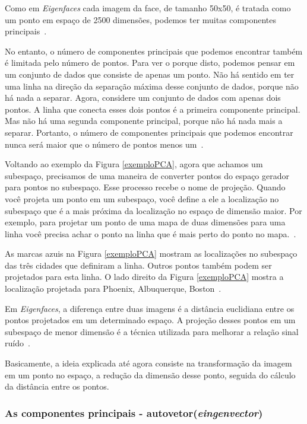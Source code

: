 Como em \textit{Eigenfaces} cada imagem da face, de tamanho 50x50, é tratada como um ponto em espaço de 2500 dimensões, podemos ter muitas componentes principais~\cite{hewitt}.

No entanto, o número de componentes principais que podemos encontrar também é limitada pelo número de pontos. Para ver o porque disto, podemos pensar em um conjunto de dados que consiste de apenas um ponto. Não há sentido em ter uma linha na direção da separação máxima desse conjunto de dados, porque não há nada a separar. Agora, considere um conjunto de dados com apenas dois pontos. A linha que conecta esses dois pontos é a primeira componente principal. Mas não há uma segunda componente principal, porque não há nada mais a separar. Portanto, o número de componentes principais que podemos encontrar nunca será maior que o número de pontos menos um~\cite{hewitt}.

Voltando ao exemplo da Figura \ref{exemploPCA}, agora que achamos um subespaço, precisamos de uma maneira de converter pontos do espaço gerador para pontos no subespaço. Esse processo recebe o nome de projeção. Quando você projeta um ponto em um subespaço, você define a ele a localização no subespaço que é a mais próxima da localização no espaço de dimensão maior. Por exemplo, para projetar um ponto de uma mapa de duas dimensões para uma linha você precisa achar o ponto na linha que é mais perto do ponto no mapa.~\cite{hewitt}.

As marcas azuis na Figura \ref{exemploPCA} mostram as localizações no subespaço das três cidades que definiram a linha. Outros pontos também podem ser projetados para esta linha. O lado direito da Figura \ref{exemploPCA} mostra a localização projetada para Phoenix, Albuquerque, Boston~\cite{hewitt}.

Em \textit{Eigenfaces}, a diferença entre duas imagens é a distância euclidiana entre os pontos projetados em um determinado espaço. A projeção desses pontos em um subespaço de menor dimensão é a técnica utilizada para melhorar a relação sinal ruído~\cite{hewitt}.

Basicamente, a ideia explicada até agora consiste na transformação da imagem em um ponto no espaço, a redução da dimensão desse ponto, seguida do cálculo da distância entre os pontos.

\subsubsection{As componentes principais - autovetor(\textit{eingenvector})}

